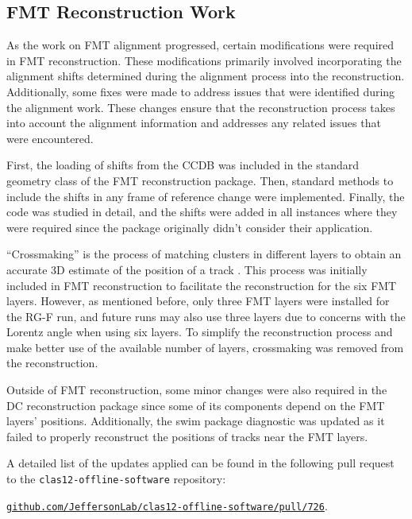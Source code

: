 \subsection{FMT Reconstruction Work}
\label{ssec::fmt_reconstruction_work}
    As the work on FMT alignment progressed, certain modifications were required in FMT reconstruction.
    These modifications primarily involved incorporating the alignment shifts determined during the alignment process into the reconstruction.
    Additionally, some fixes were made to address issues that were identified during the alignment work.
    These changes ensure that the reconstruction process takes into account the alignment information and addresses any related issues that were encountered.

    First, the loading of shifts from the CCDB was included in the standard geometry class of the FMT reconstruction package.
    Then, standard methods to include the shifts in any frame of reference change were implemented.
    Finally, the code was studied in detail, and the shifts were added in all instances where they were required since the package originally didn't consider their application.

    ``Crossmaking'' is the process of matching clusters in different layers to obtain an accurate 3D estimate of the position of a track \cite{ziegler2020}.
    This process was initially included in FMT reconstruction to facilitate the reconstruction for the six FMT layers.
    However, as mentioned before, only three FMT layers were installed for the RG-F run, and future runs may also use three layers due to concerns with the Lorentz angle when using six layers.
    To simplify the reconstruction process and make better use of the available number of layers, crossmaking was removed from the reconstruction.

    Outside of FMT reconstruction, some minor changes were also required in the DC reconstruction package since some of its components depend on the FMT layers' positions.
    Additionally, the swim package diagnostic was updated as it failed to properly reconstruct the positions of tracks near the FMT layers.

    A detailed list of the updates applied can be found in the following pull request to the \texttt{clas12-offline-software} repository:

    \href{github.com/JeffersonLab/clas12-offline-software/pull/726}{\texttt{github.com/JeffersonLab/clas12-offline-software/pull/726}}.

